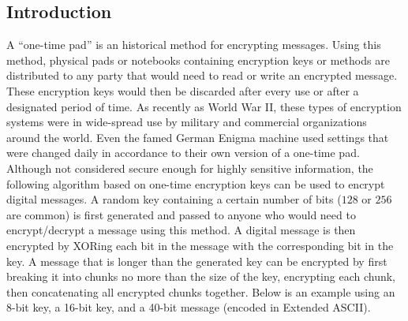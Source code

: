 		\subsection{Introduction}
			A ``one-time pad'' is an historical method for encrypting messages. Using this method, physical pads or notebooks containing encryption keys or methods are distributed to any party that would need to read or write an encrypted message. These encryption keys would then be discarded after every use or after a designated period of time. As recently as World War II, these types of encryption systems were in wide-spread use by military and commercial organizations around the world. Even the famed German Enigma machine used settings that were changed daily in accordance to their own version of a one-time pad.\\[\baselineskip]
			Although not considered secure enough for highly sensitive information, the following algorithm based on one-time encryption keys can be used to encrypt digital messages. A random key containing a certain number of bits ($128$ or $256$ are common) is first generated and passed to anyone who would need to encrypt/decrypt a message using this method. A digital message is then encrypted by XORing each bit in the message with the corresponding bit in the key. A message that is longer than the generated key can be encrypted by first breaking it into chunks no more than the size of the key, encrypting each chunk, then concatenating all encrypted chunks together. Below is an example using an 8-bit key, a 16-bit key, and a 40-bit message (encoded in Extended ASCII).
			\ \\[\baselineskip]
			\ \\[9pt]
